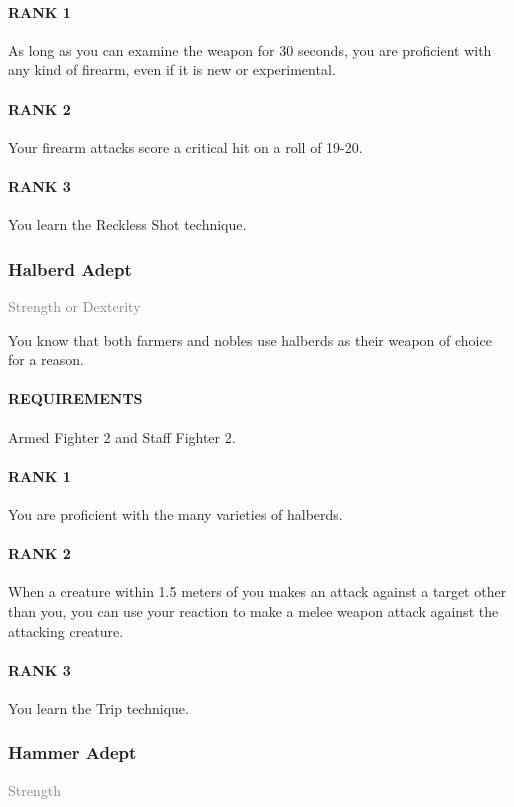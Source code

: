 \paragraph{RANK 1} As long as you can examine the weapon for 30 seconds, you are proficient with any kind of firearm, even if it is new or experimental.
\paragraph{RANK 2} Your firearm attacks score a critical hit on a roll of 19-20.
\paragraph{RANK 3} You learn the Reckless Shot technique.

\subsubsection{Halberd Adept} \label{feat::halberdadept}
\small{\textcolor{gray}{Strength or Dexterity}}

\normalsize
You know that both farmers and nobles use halberds as their weapon of choice for a reason.
\paragraph{REQUIREMENTS} Armed Fighter 2 and Staff Fighter 2.
\paragraph{RANK 1} You are proficient with the many varieties of halberds.
\paragraph{RANK 2} When a creature within 1.5 meters of you makes an attack against a target other than you, you can use your reaction to make a melee weapon attack against the attacking creature.
\paragraph{RANK 3} You learn the Trip technique.

\subsubsection{Hammer Adept} \label{feat::hammeradept}
\small{\textcolor{gray}{Strength}}

